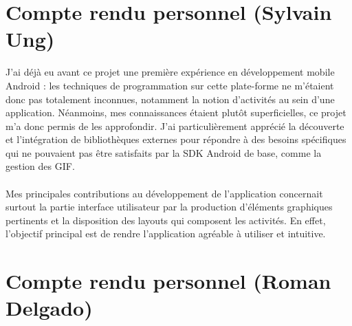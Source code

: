 \section{Compte rendu personnel (Sylvain Ung)}

J'ai déjà eu avant ce projet une première expérience en développement mobile Android : les techniques de programmation sur cette plate-forme ne m'étaient donc pas totalement inconnues, notamment la notion d'activités au sein d'une application. Néanmoins, mes connaissances étaient plutôt superficielles, ce projet m'a donc permis de les approfondir. J'ai particulièrement apprécié la découverte et l'intégration de bibliothèques externes pour répondre à des besoins spécifiques qui ne pouvaient pas être satisfaits par la SDK Android de base, comme la gestion des GIF.
\paragraph{}
Mes principales contributions au développement de l'application concernait surtout la partie interface utilisateur par la production d'éléments graphiques pertinents et la disposition des layouts qui composent les activités. En effet, l'objectif principal est de rendre l'application agréable à utiliser et intuitive.

\newpage
\section{Compte rendu personnel (Roman Delgado)}